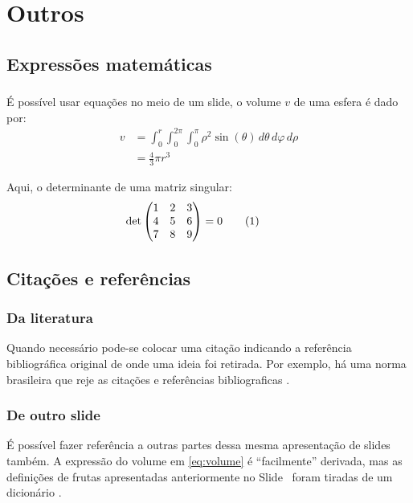 \documentclass[aspectratio=169]{beamer}
\begin{document}
\section{Outros}

\subsection{Expressões matemáticas}

\newcommand{\pulleqnum}[1][1cm]{\stepcounter{equation}\tag*{(\theequation)\hspace{#1}}}
\begin{frame}[t]\frametitle{\secname}\framesubtitle{\subsecname}
  É possível usar equações no meio de um slide, o volume $v$ de uma esfera é dado por:
  \begin{align}\label{eq:volume}
    v &= \int_0^r \int_0^{2\pi} \int_0^\pi \rho^2 \sin(\theta)\, d\theta\, d\varphi\, d\rho \\[1em]
      &= \frac{4}{3}\pi r^3
  \end{align}

  Aqui, o determinante de uma matriz singular:
  \begin{equation}
    \det \begin{pmatrix}
      1 & 2 & 3 \\
      4 & 5 & 6 \\
      7 & 8 & 9
    \end{pmatrix} = 0\pulleqnum
  \end{equation}
\end{frame}

\subsection{Citações e referências}

\begin{frame}[t]\frametitle{\secname}\framesubtitle{\subsecname}%
  \subsubsection{Da literatura}
  Quando necessário pode-se colocar uma citação indicando a referência bibliográfica original de onde uma ideia foi retirada.
  Por exemplo, há uma norma brasileira que reje as citações e referências bibliograficas \cite{NBR6023:2000}.

  \subsubsection{De outro slide}
  É possível fazer referência a outras partes dessa mesma apresentação de slides também.
  A expressão do volume em \eqref{eq:volume} é ``facilmente'' derivada, mas as definições de frutas apresentadas anteriormente no Slide~ foram tiradas de um dicionário \cite{figueiredo1913novo}.
\end{frame}
\end{document}
